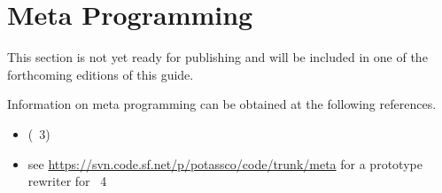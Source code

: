 \section{Meta Programming}\label{sec:meta}

This section is not yet ready for publishing
and will be included in one of the forthcoming editions of this guide.

Information on meta programming can be obtained at the following references.

\begin{itemize}
\item \cite{gekasc11b} (\gringo\ 3)
\item see \url{https://svn.code.sf.net/p/potassco/code/trunk/meta} for a prototype rewriter for \gringo\ 4
\end{itemize}

